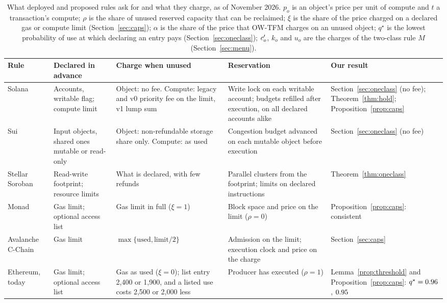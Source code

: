 \begin{table}[t]
\centering
\caption{What deployed and proposed rules ask for and what they charge, as of November 2026. $p_o$ is an object's price per unit of compute and $t$ a transaction's compute; $\rho$ is the share of unused reserved capacity that can be reclaimed; $\xi$ is the share of the price charged on a declared gas or compute limit (Section~\ref{sec:caps}); $\alpha$ is the share of the price that OW-TFM charges on an unused object; $q^\star$ is the lowest probability of use at which declaring an entry pays (Section~\ref{sec:oneclass}); $c'_o$, $k_o$ and $u_o$ are the charges of the two-class rule $M$ (Section~\ref{sec:menu}).}
\label{tab:chains}
\footnotesize
\setlength{\tabcolsep}{4pt}
\begin{tabular}{@{}l>{\raggedright\arraybackslash}p{2.8cm}>{\raggedright\arraybackslash}p{4.2cm}>{\raggedright\arraybackslash}p{3.2cm}>{\raggedright\arraybackslash}p{2.5cm}@{}}
\toprule
Rule & Declared in advance & Charge when unused & Reservation & Our result \\
\midrule
Solana~\cite{agave,simd0385} & Accounts, writable flag; compute limit & Object: no fee. Compute: legacy and v0 priority fee on the limit, v1 lump sum & Write lock on each writable account; budgets refilled after execution, on all declared accounts alike & Section~\ref{sec:oneclass} (no fee); Theorem~\ref{thm:hold}; Proposition~\ref{prop:caps} \\
Sui~\cite{suidocs_lfm,suicode} & Input objects, shared ones mutable or read-only & Object: non-refundable storage share only. Compute: as used & Congestion budget advanced on each mutable object before execution & Section~\ref{sec:oneclass} (no fee) \\
Stellar Soroban~\cite{cap0063,stellarfees} & Read-write footprint; resource limits & What is declared, with few refunds & Parallel clusters from the footprint; limits on declared instructions & Theorem~\ref{thm:oneclass} \\
Monad~\cite{monaddocs_gas} & Gas limit; optional access list & Gas limit in full ($\xi = 1$) & Block space and price on the limit ($\rho = 0$) & Proposition~\ref{prop:caps}: consistent \\
Avalanche C-Chain~\cite{acp194} & Gas limit & $\max\{\text{used}, \text{limit}/2\}$ & Admission on the limit; execution clock and price on the charge & Section~\ref{sec:caps} \\
Ethereum, today~\cite{eip2929,eip2930} & Gas limit; optional access list & Gas as used ($\xi = 0$); list entry 2,400 or 1,900, and a listed use costs 2,500 or 2,000 less & Producer has executed ($\rho = 1$) & Lemma~\ref{prop:threshold} and Proposition~\ref{prop:caps}: $q^\star = 0.96$, $0.95$ \\

\end{tabular}
\end{table}
